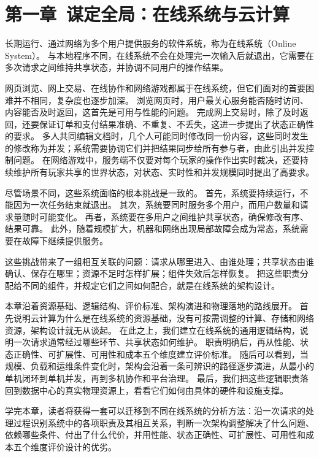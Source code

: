 \section{第一章\ 谋定全局：在线系统与云计算}\label{sec:chapter1}

长期运行、通过网络为多个用户提供服务的软件系统，称为在线系统（Online System）。
与本地程序不同，在线系统不会在处理完一次输入后就退出，它需要在多次请求之间维持共享状态，并协调不同用户的操作结果。

网页浏览、网上交易、在线协作和网络游戏都属于在线系统，但它们面对的首要困难并不相同，复杂度也逐步加深。
浏览网页时，用户最关心服务能否随时访问、内容能否及时返回，这首先是可用与性能的问题。
完成网上交易时，除了及时返回，还要保证订单和支付结果准确、不重复、不丢失，这进一步提出了状态正确性的要求。
多人共同编辑文档时，几个人可能同时修改同一份内容，这些同时发生的修改称为并发；系统需要协调它们并把结果同步给所有参与者，由此引出并发控制问题。
在网络游戏中，服务端不仅要对每个玩家的操作作出实时裁决，还要持续维护所有玩家共享的世界状态，对状态、实时性和并发规模同时提出了高要求。

尽管场景不同，这些系统面临的根本挑战是一致的。
首先，系统要持续运行，不能因为一次任务结束就退出。
其次，系统要同时服务多个用户，而用户数量和请求量随时可能变化。
再者，系统要在多用户之间维护共享状态，确保修改有序、结果可靠。
此外，随着规模扩大，机器和网络出现局部故障会成为常态，系统需要在故障下继续提供服务。

这些挑战带来了一组相互关联的问题：请求从哪里进入、由谁处理；共享状态由谁确认、保存在哪里；资源不足时怎样扩展；组件失效后怎样恢复。
把这些职责分配给不同的组件，并规定它们之间如何配合，就是在线系统的架构设计。

本章沿着资源基础、逻辑结构、评价标准、架构演进和物理落地的路线展开。
首先说明云计算为什么是在线系统的资源基础，没有可按需调整的计算、存储和网络资源，架构设计就无从谈起。
在此之上，我们建立在线系统的通用逻辑结构，说明一次请求通常经过哪些环节、共享状态如何维护。
职责明确后，再从性能、状态正确性、可扩展性、可用性和成本五个维度建立评价标准。
随后可以看到，当规模、负载和运维条件变化时，架构会沿着一条可辨识的路径逐步演进，从最小的单机闭环到单机并发，再到多机协作和平台治理。
最后，我们把这些逻辑职责落回到数据中心的真实物理资源上，看看它们如何由具体的硬件和设施支撑。

学完本章，读者将获得一套可以迁移到不同在线系统的分析方法：沿一次请求的处理过程识别系统中的各项职责及其相互关系，判断一次架构调整解决了什么问题、依赖哪些条件、付出了什么代价，并用性能、状态正确性、可扩展性、可用性和成本五个维度评价设计的优劣。


